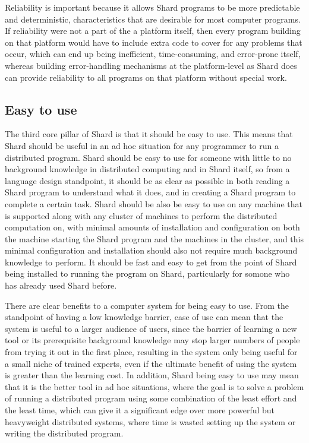 \documentclass[twoside]{report}
\begin{document}
Reliability is important because it allows Shard programs to be more predictable and deterministic, characteristics that are desirable for most computer programs. If reliability were not a part of the a platform itself, then every program building on that platform would have to include extra code to cover for any problems that occur, which can end up being inefficient, time-consuming, and error-prone itself, whereas building error-handling mechanisms at the platform-level as Shard does can provide reliability to all programs on that platform without special work.

\subsection{Easy to use}

The third core pillar of Shard is that it should be easy to use.
This means that Shard should be useful in an ad hoc situation for any programmer to run a distributed program.
Shard should be easy to use for someone with little to no background knowledge in distributed computing and in Shard itself, so from a language design standpoint, it should be as clear as possible in both reading a Shard program to understand what it does, and in creating a Shard program to complete a certain task.
Shard should be also be easy to use on any machine that is supported along with any cluster of machines to perform the distributed computation on, with minimal amounts of installation and configuration on both the machine starting the Shard program and the machines in the cluster, and this minimal configuration and installation should also not require much background knowledge to perform.
It should be fast and easy to get from the point of Shard being installed to running the program on Shard, particularly for somone who has already used Shard before.

There are clear benefits to a computer system for being easy to use.
From the standpoint of having a low knowledge barrier, ease of use can mean that the system is useful to a larger audience of users, since the barrier of learning a new tool or its prerequisite background knowledge may stop larger numbers of people from trying it out in the first place, resulting in the system only being useful for a small niche of trained experts, even if the ultimate benefit of using the system is greater than the learning cost.
In addition, Shard being easy to use may mean that it is the better tool in ad hoc situations, where the goal is to solve a problem of running a distributed program using some combination of the least effort and the least time, which can give it a significant edge over more powerful but heavyweight distributed systems, where time is wasted setting up the system or writing the distributed program.
\end{document}
